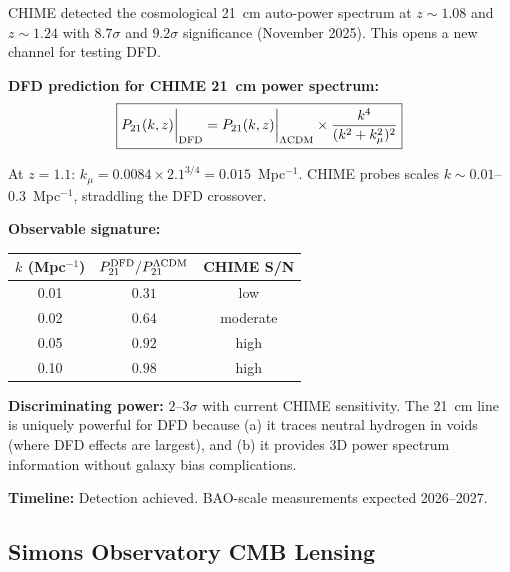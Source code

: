 \documentclass[11pt,a4paper]{article}
\begin{document}
\begin{newbox}

CHIME detected the cosmological 21~cm auto-power spectrum at
$z \sim 1.08$ and $z \sim 1.24$ with $8.7\sigma$ and $9.2\sigma$
significance (November 2025). This opens a new channel for testing DFD.

\textbf{DFD prediction for CHIME 21~cm power spectrum:}
\begin{equation}
\boxed{
P_{21}(k,z)\bigg|_{\rm DFD} = P_{21}(k,z)\bigg|_{\Lambda\rm CDM}
\times \frac{k^4}{(k^2 + k_\mu^2)^2}
}
\end{equation}

At $z = 1.1$: $k_\mu = 0.0084 \times 2.1^{3/4} = 0.015$~Mpc$^{-1}$.
CHIME probes scales $k \sim 0.01$--$0.3$~Mpc$^{-1}$, straddling the
DFD crossover.

\textbf{Observable signature:}
\begin{center}
\begin{tabular}{ccc}
\toprule
$k$ (Mpc$^{-1}$) & $P_{21}^{\rm DFD}/P_{21}^{\Lambda\rm CDM}$ &
CHIME S/N \\
\midrule
0.01 & $0.31$ & low \\
0.02 & $0.64$ & moderate \\
0.05 & $0.92$ & high \\
0.10 & $0.98$ & high \\
\bottomrule
\end{tabular}
\end{center}

\textbf{Discriminating power:} $2$--$3\sigma$ with current CHIME
sensitivity. The 21~cm line is uniquely powerful for DFD because
(a) it traces neutral hydrogen in voids (where DFD effects are
largest), and (b) it provides 3D power spectrum information without
galaxy bias complications.

\textbf{Timeline:} Detection achieved. BAO-scale measurements
expected 2026--2027.
\end{newbox}

\subsection{Simons Observatory CMB Lensing}
\end{document}
